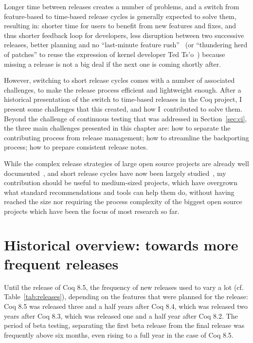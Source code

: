 Longer time between releases creates a number of problems, and a switch from feature-based to time-based release cycles is generally expected to solve them, resulting in: shorter time for users to benefit from new features and fixes, and thus shorter feedback loop for developers, less disruption between two successive releases, better planning and no ``last-minute feature rush''~\cite{fogel2005producing} (or ``thundering herd of patches'' to reuse the expression of kernel developer Ted Ts'o~\cite{corbet2002kernel}) because missing a release is not a big deal if the next one is coming shortly after.

However, switching to short release cycles comes with a number of associated challenges, to make the release process efficient and lightweight enough.
After a historical presentation of the switch to time-based releases in the Coq project, I present some challenges that this created, and how I contributed to solve them.
Beyond the challenge of continuous testing that was addressed in Section~\ref{sec:ci}, the three main challenges presented in this chapter are: how to separate the contributing process from release management; how to streamline the backporting process; how to prepare consistent release notes.

While the complex release strategies of large open source projects are already well documented~\cite{gcc_dev_plan,erenkrantz2003release,rahman2015release,khomh2012faster,jorgensen2001putting}, and short release cycles have now been largely studied~\cite{cesar2017frequent}, my contribution should be useful to medium-sized projects, which have overgrown what standard recommendations and tools can help them do, without having reached the size nor requiring the process complexity of the biggest open source projects which have been the focus of most research so far.

\section{Historical overview: towards more frequent releases}

\label{sec:frequent-releases}

Until the release of Coq 8.5, the frequency of new releases used to vary a lot (cf. Table~\ref{tab:releases}), depending on the features that were planned for the release: Coq 8.5 was released three and a half years after Coq 8.4, which was released two years after Coq 8.3, which was released one and a half year after Coq 8.2.
The period of beta testing, separating the first beta release from the final release was frequently above six months, even rising to a full year in the case of Coq 8.5.

